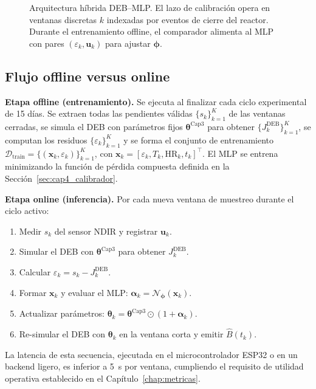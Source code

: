 \begin{figure}[htbp]
\centering
\caption{Arquitectura híbrida DEB--MLP. El lazo de calibración opera en ventanas discretas $k$ indexadas por eventos de cierre del reactor. Durante el entrenamiento offline, el comparador alimenta al MLP con pares $(\varepsilon_k, \mathbf{u}_k)$ para ajustar $\boldsymbol{\phi}$.}
\label{fig:arquitectura_hibrida}
\end{figure}

\subsection{Flujo offline versus online}

\textbf{Etapa offline (entrenamiento).} Se ejecuta al finalizar cada ciclo experimental de 15 días. Se extraen todas las pendientes válidas $\{s_k\}_{k=1}^{K}$ de las ventanas cerradas, se simula el DEB con parámetros fijos $\boldsymbol{\theta}^{\mathrm{Cap3}}$ para obtener $\{J_k^{\mathrm{DEB}}\}_{k=1}^{K}$, se computan los residuos $\{\varepsilon_k\}_{k=1}^{K}$ y se forma el conjunto de entrenamiento $\mathcal{D}_{\mathrm{train}} = \{(\mathbf{x}_k, \varepsilon_k)\}_{k=1}^{K}$, con $\mathbf{x}_k = [\varepsilon_k, T_k, \mathrm{HR}_k, t_k]^{\top}$. El MLP se entrena minimizando la función de pérdida compuesta definida en la Sección~\ref{sec:cap4_calibrador}.

\textbf{Etapa online (inferencia).} Por cada nueva ventana de muestreo durante el ciclo activo:
\begin{enumerate}
\item Medir $s_k$ del sensor NDIR y registrar $\mathbf{u}_k$.
\item Simular el DEB con $\boldsymbol{\theta}^{\mathrm{Cap3}}$ para obtener $J_k^{\mathrm{DEB}}$.
\item Calcular $\varepsilon_k = s_k - J_k^{\mathrm{DEB}}$.
\item Formar $\mathbf{x}_k$ y evaluar el MLP: $\boldsymbol{\alpha}_k = \mathcal{N}_{\boldsymbol{\phi}}(\mathbf{x}_k)$.
\item Actualizar parámetros: $\boldsymbol{\theta}_k = \boldsymbol{\theta}^{\mathrm{Cap3}} \odot (1+\boldsymbol{\alpha}_k)$.
\item Re-simular el DEB con $\boldsymbol{\theta}_k$ en la ventana corta y emitir $\hat{B}(t_k)$.
\end{enumerate}

La latencia de esta secuencia, ejecutada en el microcontrolador ESP32 o en un backend ligero, es inferior a \SI{5}{\second} por ventana, cumpliendo el requisito de utilidad operativa establecido en el Capítulo~\ref{chap:metricas}.
